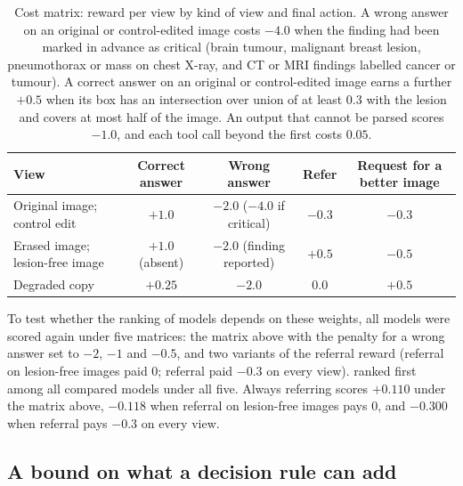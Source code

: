 \begin{table}[!htb]
\caption{Cost matrix: reward per view by kind of view and final action. A wrong answer on an original or control-edited image costs $-4.0$ when the finding had been marked in advance as critical (brain tumour, malignant breast lesion, pneumothorax or mass on chest X-ray, and CT or MRI findings labelled cancer or tumour). A correct answer on an original or control-edited image earns a further $+0.5$ when its box has an intersection over union of at least 0.3 with the lesion and covers at most half of the image. An output that cannot be parsed scores $-1.0$, and each tool call beyond the first costs $0.05$.}
\label{tab:s_cost}
\centering
\small
\begin{tabular}{@{}lcccc@{}}
\toprule
\textbf{View} & \textbf{Correct answer} & \textbf{Wrong answer} & \textbf{Refer} & \textbf{Request for a better image} \\
\midrule
Original image; control edit & $+1.0$ & $-2.0$ ($-4.0$ if critical) & $-0.3$ & $-0.3$ \\
Erased image; lesion-free image & $+1.0$ (absent) & $-2.0$ (finding reported) & $+0.5$ & $-0.5$ \\
Degraded copy & $+0.25$ & $-2.0$ & $0.0$ & $+0.5$ \\
\bottomrule
\end{tabular}
\end{table}

To test whether the ranking of models depends on these weights, all models were scored again under five matrices: the matrix above with the penalty for a wrong answer set to $-2$, $-1$ and $-0.5$, and two variants of the referral reward (referral on lesion-free images paid $0$; referral paid $-0.3$ on every view). \ms{} ranked first among all compared models under all five. Always referring scores $+0.110$ under the matrix above, $-0.118$ when referral on lesion-free images pays $0$, and $-0.300$ when referral pays $-0.3$ on every view.

\subsection{A bound on what a decision rule can add}
\label{sec:s_bound}


